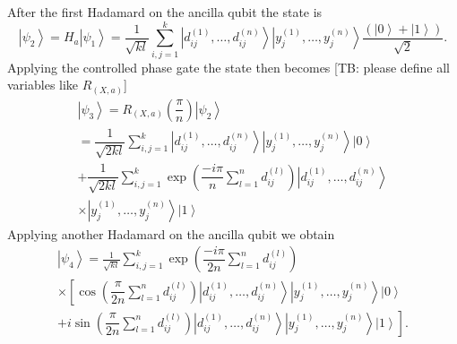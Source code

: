 \documentclass[pra,showkeys,twocolumn,showpacs]{revtex4-1}
\begin{document}
After the first Hadamard on the ancilla qubit the state is
%
\begin{equation}
    \left| \psi_2 \right\rangle = H_a\left| \psi_1 \right\rangle = 
    \frac{1}{\sqrt{kl}}\sum\limits_{i, j=1}^{k} 
    \left| d^{(1)}_{ij}, \dots, d^{(n)}_{ij} \right\rangle 
    \left| y^{(1)}_j, \dots, y^{(n)}_j \right\rangle
    \dfrac{(\left| 0 \right\rangle + \left| 1 \right\rangle)}{\sqrt{2}}  .
\end{equation}
%
Applying the controlled phase gate the state then becomes [TB: please define all variables like $ R_{(X,a)} $]
%
\begin{multline}
    \left| \psi_3 \right\rangle = R_{(X,a)}\left(\dfrac{\pi}{n}\right)\left| \psi_2 \right\rangle
    \\ = \dfrac{1}{\sqrt{2kl}}
				\sum\limits_{i, j=1}^{k} 
				\left| d^{(1)}_{ij}, \dots, d^{(n)}_{ij} \right\rangle 
        \left| y^{(1)}_j, \dots, y^{(n)}_j \right\rangle 
        \left| 0 \right\rangle
        \\ + \dfrac{1}{\sqrt{2kl}}
				\sum\limits_{i, j=1}^{k}
        \exp\left(\dfrac{-i \pi}{n}\sum\limits_{l=1}^n d^{(l)}_{ij} \right)
        \left| d^{(1)}_{ij}, \dots, d^{(n)}_{ij} \right\rangle 
\\ \times        \left| y^{(1)}_j, \dots, y^{(n)}_j \right\rangle 
        \left| 1 \right\rangle
\end{multline}
%
%
%
Applying another Hadamard on the ancilla qubit we obtain
%
\begin{multline}
    \left| \psi_4 \right\rangle = 
    \frac{1}{\sqrt{kl}}\sum\limits_{i, j=1}^{k} 
    \exp \left(\dfrac{-i \pi}{2n}\sum\limits_{l=1}^n d^{(l)}_{ij} \right)
		\\ \times
        \left[ \cos\left(\dfrac{\pi}{2n}\sum\limits_{l=1}^n d^{(l)}_{ij} \right)
        \left| d^{(1)}_{ij}, \dots, d^{(n)}_{ij} \right\rangle 
        \left| y^{(1)}_j, \dots, y^{(n)}_j \right\rangle 
        \left| 0 \right\rangle\right.
        \\+ 
        \left. i \sin\left(\dfrac{\pi}{2n}\sum\limits_{l=1}^n d^{(l)}_{ij} \right)
        \left| d^{(1)}_{ij}, \dots, d^{(n)}_{ij} \right\rangle 
        \left| y^{(1)}_j, \dots, y^{(n)}_j \right\rangle 
        \left| 1 \right\rangle\right] .
\end{multline}
\end{document}
